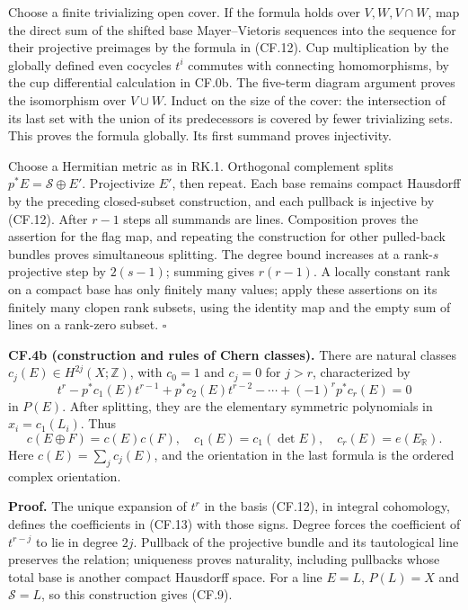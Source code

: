 \documentclass[
  11pt,
]{article}
\begin{document}
Choose a finite trivializing open cover. If the formula holds over
\(V,W,V\cap W\), map the direct sum of the shifted base Mayer--Vietoris
sequences into the sequence for their projective preimages by the
formula in (CF.12). Cup multiplication by the globally defined even
cocycles \(t^i\) commutes with connecting homomorphisms, by the cup
differential calculation in CF.0b. The five-term diagram argument proves
the isomorphism over \(V\cup W\). Induct on the size of the cover: the
intersection of its last set with the union of its predecessors is
covered by fewer trivializing sets. This proves the formula globally.
Its first summand proves injectivity.

Choose a Hermitian metric as in RK.1. Orthogonal complement splits
\(p^*E=\mathcal S\oplus E'\). Projectivize \(E'\), then repeat. Each
base remains compact Hausdorff by the preceding closed-subset
construction, and each pullback is injective by (CF.12). After \(r-1\)
steps all summands are lines. Composition proves the assertion for the
flag map, and repeating the construction for other pulled-back bundles
proves simultaneous splitting. The degree bound increases at a
rank-\(s\) projective step by \(2(s-1)\); summing gives \(r(r-1)\). A
locally constant rank on a compact base has only finitely many values;
apply these assertions on its finitely many clopen rank subsets, using
the identity map and the empty sum of lines on a rank-zero subset.
\(\square\)

\textbf{CF.4b (construction and rules of Chern classes).} There are
natural classes \(c_j(E)\in H^{2j}(X;\mathbb Z)\), with \(c_0=1\) and
\(c_j=0\) for \(j>r\), characterized by \[
t^r-p^*c_1(E)t^{r-1}+p^*c_2(E)t^{r-2}
-\cdots+(-1)^r p^*c_r(E)=0
\tag{CF.13}
\] in \(P(E)\). After splitting, they are the elementary symmetric
polynomials in \(x_i=c_1(L_i)\). Thus \[
c(E\oplus F)=c(E)c(F),\quad
c_1(E)=c_1(\det E),\quad c_r(E)=e(E_{\mathbb R}).
\tag{CF.14}
\] Here \(c(E)=\sum_jc_j(E)\), and the orientation in the last formula
is the ordered complex orientation.

\textbf{Proof.} The unique expansion of \(t^r\) in the basis (CF.12), in
integral cohomology, defines the coefficients in (CF.13) with those
signs. Degree forces the coefficient of \(t^{r-j}\) to lie in degree
\(2j\). Pullback of the projective bundle and its tautological line
preserves the relation; uniqueness proves naturality, including
pullbacks whose total base is another compact Hausdorff space. For a
line \(E=L\), \(P(L)=X\) and \(\mathcal S=L\), so this construction
gives (CF.9).
\end{document}
